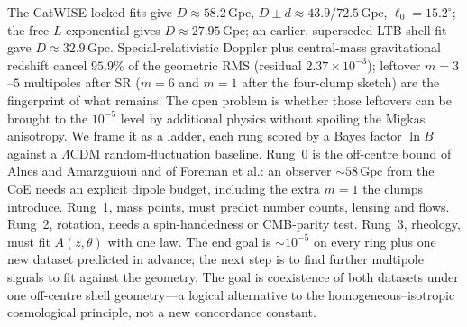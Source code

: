 \documentclass[11pt,a4paper]{article}
\begin{document}
The CatWISE-locked fits give \(D\approx58.2\,\mathrm{Gpc}\), \(D{\pm}d\approx43.9/72.5\,\mathrm{Gpc}\), \(\ell_0=15.2^\circ\); the free-\(L\) exponential gives \(D\approx27.95\,\mathrm{Gpc}\); an earlier, superseded LTB shell fit gave \(D\approx32.9\,\mathrm{Gpc}\). Special-relativistic Doppler plus central-mass gravitational redshift cancel \(95.9\%\) of the geometric RMS (residual \(2.37\times10^{-3}\)); leftover \(m=3\)--\(5\) multipoles after SR (\(m=6\) and \(m=1\) after the four-clump sketch) are the fingerprint of what remains. The open problem is whether those leftovers can be brought to the \(10^{-5}\) level by additional physics without spoiling the Migkas anisotropy. We frame it as a ladder, each rung scored by a Bayes factor \(\ln B\) against a \(\Lambda\)CDM random-fluctuation baseline. Rung~0 is the off-centre bound of Alnes and Amarzguioui and of Foreman et al.: an observer \(\sim58\,\mathrm{Gpc}\) from the CoE needs an explicit dipole budget, including the extra \(m=1\) the clumps introduce. Rung~1, mass points, must predict number counts, lensing and flows. Rung~2, rotation, needs a spin-handedness or CMB-parity test. Rung~3, rheology, must fit \(A(z,\theta)\) with one law. The end goal is \(\sim10^{-5}\) on every ring plus one new dataset predicted in advance; the next step is to find further multipole signals to fit against the geometry. The goal is coexistence of both datasets under one off-centre shell geometry---a logical alternative to the homogeneous--isotropic cosmological principle, not a new concordance constant.
\end{document}
